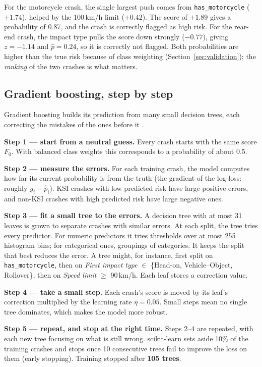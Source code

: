 \documentclass[11pt,a4paper]{article}
\begin{document}
For the motorcycle crash, the single largest push comes from \texttt{has\_motorcycle} ($+1.74$), helped by the
100\,km/h limit ($+0.42$). The score of $+1.89$ gives a probability of 0.87, and the crash is correctly flagged as
high risk. For the rear-end crash, the impact type pulls the score down strongly ($-0.77$), giving $z = -1.14$ and
$\hat{p} = 0.24$, so it is correctly not flagged. Both probabilities are higher than the true risk because of class
weighting (Section~\ref{sec:validation}); the \emph{ranking} of the two crashes is what matters.

\subsection{Gradient boosting, step by step}
\label{app:gb}

Gradient boosting builds its prediction from many small decision trees, each correcting the mistakes of the ones
before it \parencite{friedman2001,ke2017}.

\textbf{Step 1 --- start from a neutral guess.} Every crash starts with the same score $F_0$. With balanced class
weights this corresponds to a probability of about 0.5.

\textbf{Step 2 --- measure the errors.} For each training crash, the model computes how far its current probability is
from the truth (the gradient of the log-loss: roughly $y_i - \hat{p}_i$). KSI crashes with low predicted risk have
large positive errors, and non-KSI crashes with high predicted risk have large negative ones.

\textbf{Step 3 --- fit a small tree to the errors.} A decision tree with at most 31 leaves is grown to separate crashes
with similar errors. At each split, the tree tries every predictor. For numeric predictors it tries thresholds over at most
255 histogram bins; for categorical ones, groupings of categories. It keeps the split that best reduces the error.
A tree might, for instance, first split on \texttt{has\_motorcycle}, then on \emph{First impact type} $\in$
\{Head-on, Vehicle--Object, Rollover\}, then on \emph{Speed limit} $\geq$ 90\,km/h. Each leaf stores a correction value.

\textbf{Step 4 --- take a small step.} Each crash's score is moved by its leaf's correction multiplied by the learning
rate $\eta = 0.05$. Small steps mean no single tree dominates, which makes the model more robust.

\textbf{Step 5 --- repeat, and stop at the right time.} Steps 2--4 are repeated, with each new tree focusing on what is
still wrong. scikit-learn sets aside 10\% of the training crashes and stops once 10 consecutive trees fail to improve
the loss on them (early stopping). Training stopped after \textbf{105 trees}.
\end{document}
